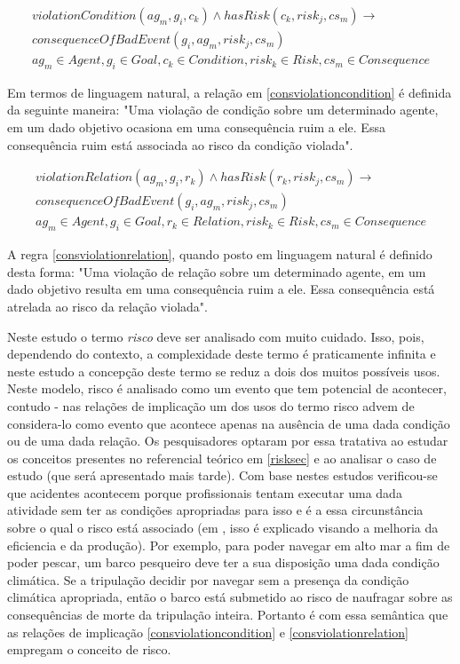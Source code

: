 \begin{eqnarray}\label{consviolationcondition}\nonumber
	violationCondition(ag_m,g_i,c_k)  \wedge hasRisk(c_k,risk_j,cs_m) \to \nonumber \\ 
	consequenceOfBadEvent(g_i,ag_m,risk_j,cs_m) \nonumber \\ 
    ag_m \in Agent, g_i \in Goal, c_k \in Condition, risk_k \in Risk, cs_m \in Consequence
\end{eqnarray}

Em termos de linguagem natural, a relação em \ref{consviolationcondition} é definida da seguinte maneira: "Uma violação de condição sobre um determinado 
agente, em um dado objetivo ocasiona em uma consequência ruim a ele. Essa consequência ruim está associada ao risco da condição violada". 

\begin{eqnarray}\label{consviolationrelation}\nonumber
	violationRelation(ag_m,g_i,r_k) \wedge hasRisk(r_k,risk_j,cs_m) \to \\ 
	consequenceOfBadEvent(g_i,ag_m,risk_j,cs_m) \nonumber \\ 
    ag_m \in Agent, g_i \in Goal, r_k \in Relation, risk_k \in Risk, cs_m \in Consequence 
\end{eqnarray}

A regra \ref{consviolationrelation}, quando posto em linguagem natural é definido desta forma: "Uma violação de relação sobre um determinado agente, 
em um dado objetivo resulta em uma consequência ruim a ele. Essa consequência está atrelada ao risco da relação violada". 

Neste estudo o termo \textit{risco} deve ser analisado com muito cuidado. Isso, pois, dependendo do contexto, a complexidade deste termo é praticamente 
infinita e neste estudo a concepção deste termo se reduz a dois dos muitos possíveis usos. Neste modelo, risco é analisado como um evento que tem potencial 
de acontecer, contudo - nas relações de implicação um dos usos do termo risco advem de considera-lo como evento que acontece apenas na ausência de uma dada condição ou de uma dada relação. 
Os pesquisadores optaram por essa tratativa ao estudar os conceitos presentes no referencial teórico em \ref{risksec} e ao analisar o caso de estudo (que será apresentado mais tarde). 
Com base nestes estudos verificou-se que acidentes acontecem porque profissionais tentam executar uma dada atividade sem ter as condições apropriadas 
para isso e é a essa circunstância sobre o qual o risco está associado (em \cite{safety}, isso é explicado visando a melhoria da eficiencia e da produção). 
Por exemplo, para poder navegar em alto mar a fim de poder pescar, um barco pesqueiro deve ter a sua disposição uma dada condição climática. Se a tripulação 
decidir por navegar sem a presença da condição climática apropriada, então o barco está submetido ao risco de naufragar sobre as consequências de morte da 
tripulação inteira. Portanto é com essa semântica que as relações de implicação \ref{consviolationcondition} e \ref{consviolationrelation} empregam o conceito de risco. 

